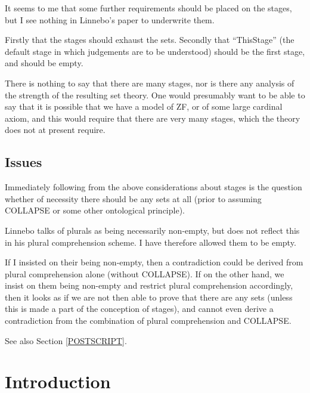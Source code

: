 \documentclass[11pt]{article}
\begin{document}
It seems to me that some further requirements should be placed on the stages, but I see nothing in Linnebo's paper to underwrite them.

Firstly that the stages should exhaust the sets.
Secondly that ``ThisStage'' (the default stage in which judgements are to be understood) should be the first stage, and should be empty.

There is nothing to say that there are many stages, nor is there any analysis of the strength of the resulting set theory.
One would presumably want to be able to say that it is possible that we have a model of ZF, or of some large cardinal axiom, and this would require that there are very many stages, which the theory does not at present require.

\subsection{Issues}

Immediately following from the above considerations about stages is the question whether of necessity there should be any sets at all (prior to assuming COLLAPSE or some other ontological principle).

Linnebo talks of plurals as being necessarily non-empty, but does not reflect this in his plural comprehension scheme.
I have therefore allowed them to be empty.

If I insisted on their being non-empty, then a contradiction could be derived from plural comprehension alone (without COLLAPSE).
If on the other hand, we insist on them being non-empty and restrict plural comprehension accordingly, then it looks as if we are not then able to prove that there are any sets (unless this is made a part of the conception of stages), and cannot even derive a contradiction from the combination of plural comprehension and COLLAPSE.

See also Section \ref{POSTSCRIPT}.

\section{Introduction}
\end{document}
